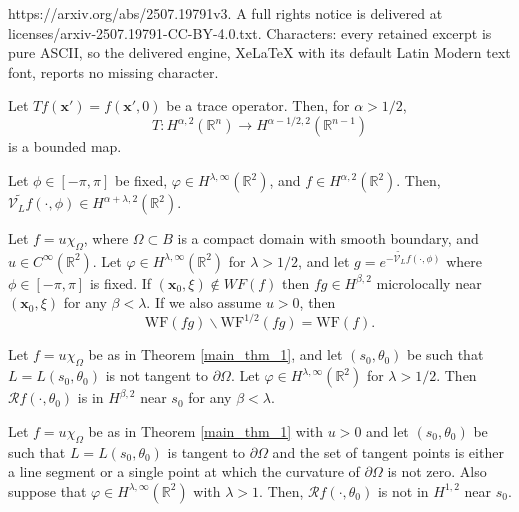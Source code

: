 \documentclass[10pt,a4paper]{amsart}
\newcommand{\WF}{\mathrm{WF}}                         %
\newcommand{\vx}{{\mathbf{x}}}
\begin{document}
https://arxiv.org/abs/2507.19791v3. A full rights notice is delivered at licenses/arxiv-2507.19791-CC-BY-4.0.txt. Characters: every retained excerpt is pure ASCII, so the delivered engine, XeLaTeX with its default Latin Modern text font, reports no missing character.
\begin{theorem}
\label{trace_thm}
Let $Tf(\vx') = f(\vx',0)$ be a trace operator. Then, for $\alpha > 1/2$,
\begin{equation}
T: H^{\alpha,2}(\mathbb{R}^n) \to H^{\alpha-1/2,2}(\mathbb{R}^{n-1})
\end{equation}
is a bounded map.
\end{theorem}

\begin{theorem}
\label{thm_V_smth}
Let $\phi \in [-\pi,\pi]$ be fixed, $\varphi \in H^{\lambda,\infty}(\mathbb{R}^2)$, and $f \in H^{\alpha,2}(\mathbb{R}^2)$. Then, $\widetilde{\mathcal{V}_L f }(\cdot,\phi) \in H^{\alpha + \lambda,2}(\mathbb{R}^2)$.
\end{theorem}

\begin{theorem}\label{main_thm_1}
Let $f = u\chi_{\Omega}$, where $\Omega \subset B$ is a compact domain with smooth boundary, and $u \in C^\infty(\mathbb{R}^2)$. Let $\varphi \in H^{\lambda,\infty}(\mathbb{R}^2)$ for $\lambda > 1/2$, and let $g = e^{ -\widetilde{\mathcal{V}_L}f(\cdot,\phi) }$ where $\phi \in [-\pi, \pi]$ is fixed. If $(\vx_0,\xi) \notin WF(f)$ then $fg \in H^{\beta,2}$ microlocally near $(\vx_0,\xi)$ for any $\beta < \lambda$. If we also assume $u>0$, then
\begin{equation}
\WF(fg)\backslash \WF^{1/2}(fg) = \WF(f).
\end{equation}
\end{theorem}

\begin{theorem}
\label{main_1}
Let $f = u\chi_\Omega$ be as in Theorem \ref{main_thm_1}, and let $(s_0,\theta_0)$ be such that $L = L(s_0,\theta_0)$ is not tangent to $\partial \Omega$. Let $\varphi \in H^{\lambda,\infty}(\mathbb{R}^2)$ for $\lambda > 1/2$. Then $\mathcal{R}f(\cdot,\theta_0)$ is in $H^{\beta,2}$ near $s_0$ for any $\beta < \lambda$.
\end{theorem}

\begin{theorem}
\label{main_2}
Let $f = u\chi_\Omega$ be as in Theorem \ref{main_thm_1} with $u>0$ and let $(s_0,\theta_0)$ be such that $L = L(s_0,\theta_0)$ is tangent to $\partial \Omega$ and the set of tangent points is either a line segment or a single point at which the curvature of $\partial \Omega$ is not zero. Also suppose that $\varphi \in H^{\lambda,\infty}(\mathbb{R}^2)$ with $\lambda > 1$. Then, $\mathcal{R}f(\cdot,\theta_0)$ is not in $H^{1,2}$ near $s_0$.
\end{theorem}
\end{document}
